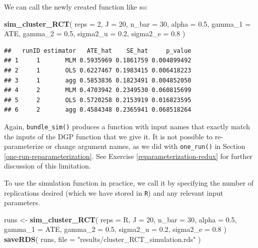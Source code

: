 \documentclass[
]{book}
\newenvironment{Shaded}{\begin{snugshade}}{\end{snugshade}}
\newcommand{\AttributeTok}[1]{\textcolor[rgb]{0.13,0.29,0.53}{#1}}
\newcommand{\DecValTok}[1]{\textcolor[rgb]{0.00,0.00,0.81}{#1}}
\newcommand{\FloatTok}[1]{\textcolor[rgb]{0.00,0.00,0.81}{#1}}
\newcommand{\FunctionTok}[1]{\textcolor[rgb]{0.13,0.29,0.53}{\textbf{#1}}}
\newcommand{\NormalTok}[1]{#1}
\newcommand{\OtherTok}[1]{\textcolor[rgb]{0.56,0.35,0.01}{#1}}
\newcommand{\StringTok}[1]{\textcolor[rgb]{0.31,0.60,0.02}{#1}}
\begin{document}
We can call the newly created function like so:

\begin{Shaded}
\begin{Highlighting}[]
\FunctionTok{sim\_cluster\_RCT}\NormalTok{( }\AttributeTok{reps =} \DecValTok{2}\NormalTok{, }
                 \AttributeTok{J =} \DecValTok{20}\NormalTok{, }\AttributeTok{n\_bar =} \DecValTok{30}\NormalTok{, }\AttributeTok{alpha =} \FloatTok{0.5}\NormalTok{,}
                 \AttributeTok{gamma\_1 =}\NormalTok{ ATE, }\AttributeTok{gamma\_2 =} \FloatTok{0.5}\NormalTok{,}
                 \AttributeTok{sigma2\_u =} \FloatTok{0.2}\NormalTok{, }\AttributeTok{sigma2\_e =} \FloatTok{0.8}\NormalTok{ )}
\end{Highlighting}
\end{Shaded}

\begin{verbatim}
##   runID estimator   ATE_hat    SE_hat     p_value
## 1     1       MLM 0.5935969 0.1861759 0.004899492
## 2     1       OLS 0.6227467 0.1983415 0.006418223
## 3     1       agg 0.5853836 0.1823491 0.004852050
## 4     2       MLM 0.4703942 0.2349530 0.060815699
## 5     2       OLS 0.5720258 0.2153919 0.016823595
## 6     2       agg 0.4584348 0.2365941 0.068518264
\end{verbatim}

Again, \texttt{bundle\_sim()} produces a function with input names that exactly match the inputs of the DGP function that we give it.
It is not possible to re-parameterize or change argument names, as we did with \texttt{one\_run()} in Section \ref{one-run-reparameterization}.
See Exercise \ref{reparameterization-redux} for further discussion of this limitation.

To use the simulation function in practice, we call it by specifying the number of replications desired (which we have stored in \texttt{R}) and any relevant input parameters.

\begin{Shaded}
\begin{Highlighting}[]
\NormalTok{runs }\OtherTok{\textless{}{-}} \FunctionTok{sim\_cluster\_RCT}\NormalTok{( }\AttributeTok{reps =}\NormalTok{ R, }
                         \AttributeTok{J =} \DecValTok{20}\NormalTok{, }\AttributeTok{n\_bar =} \DecValTok{30}\NormalTok{, }\AttributeTok{alpha =} \FloatTok{0.5}\NormalTok{,}
                         \AttributeTok{gamma\_1 =}\NormalTok{ ATE, }\AttributeTok{gamma\_2 =} \FloatTok{0.5}\NormalTok{,}
                         \AttributeTok{sigma2\_u =} \FloatTok{0.2}\NormalTok{, }\AttributeTok{sigma2\_e =} \FloatTok{0.8}\NormalTok{ )}
\FunctionTok{saveRDS}\NormalTok{( runs, }\AttributeTok{file =} \StringTok{"results/cluster\_RCT\_simulation.rds"}\NormalTok{ )}
\end{Highlighting}
\end{Shaded}
\end{document}
